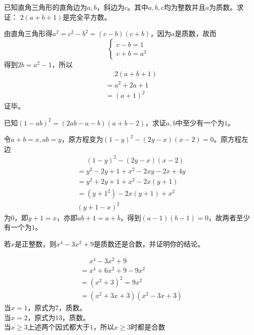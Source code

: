 \documentclass[windows,csize4,answers]{BHCexam}
\begin{document}
\begin{groups}
\begin{questions}[]
        \question[5] 已知直角三角形的直角边为$a,b$，斜边为$c$。其中$a,b,c$均为整数并且$a$为质数。求证：
        $2(a+b+1)$是完全平方数。
        \begin{solution}{0.5cm}
            \methodonly 由直角三角形得$a^2=c^2-b^2=(c-b)(c+b)$，因为$a$是质数，故而
            \[
                \begin{cases}
                    c-b=1 \\
                    c+b=a^2
                \end{cases}
            \]
            得到$2b=a^2-1$，所以
            \[
                \begin{aligned}
                    &\phantom{=}2(a+b+1) \\
                    &=a^2+2a+1 \\ 
                    &=(a+1)^2
                \end{aligned}
            \]
            证毕。
        \end{solution}
        \vspace{3.5cm}

        \question[5] 已知$(1-ab)^2=(2ab-a-b)(a+b-2)$，求证$a,b$中至少有一个为$1$。
        \begin{solution}{0.5cm}
            \methodonly 令$a+b=x, ab=y$，原方程变为$(1-y)^2-(2y-x)(x-2)=0$。原方程左边
            \[
                \begin{aligned}
                    &\phantom{=}(1-y)^2-(2y-x)(x-2) \\
                    &=y^2-2y+1+x^2-2xy-2x+4y \\ 
                    &=y^2+2y+1+x^2-2x(y+1) \\ 
                    &=(y+1^2)-2x(y+1)+x^2 \\ 
                    &(y+1-x)^2
                \end{aligned}
            \]
            为$0$，即$y+1=x$，亦即$ab+1=a+b$，得到$(a-1)(b-1)=0$，故两者至少有一个为$1$。
        \end{solution}
        \vspace{3.5cm}

        \question[5] 若$x$是正整数，则$x^4-3x^2+9$是质数还是合数，并证明你的结论。
        \begin{solution}{0.5cm}
            \methodonly 
            \[
                \begin{aligned}
                    &\phantom{=}x^4-3x^2+9 \\
                    &=x^4+6x^2+9-9x^2 \\ 
                    &=(x^2+3)^2=9x^2 \\ 
                    &=(x^2+3x+3)(x^2-3x+3) 
                \end{aligned}
            \]
            当$x=1$，原式为$7$，质数。 \\ 
            当$x=2$，原式为$13$，质数。 \\ 
            当$x\ge 3$上述两个因式都大于$1$，所以$x\ge 3$时都是合数


\end{solution}
\end{questions}
\end{groups}
\end{document}
